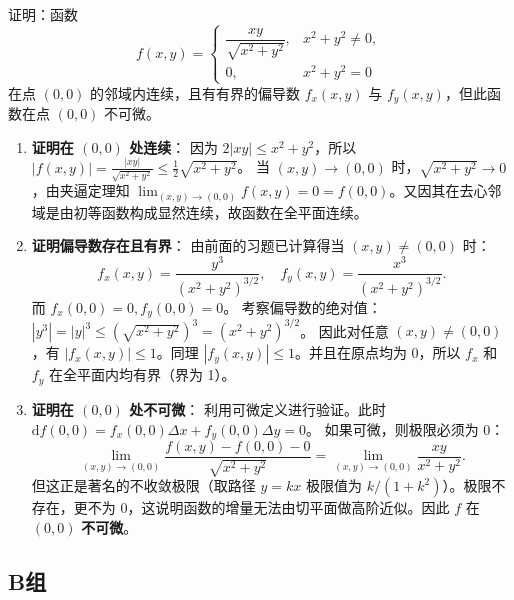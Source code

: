 \documentclass[lang=cn,11pt]{elegantbook}
\begin{document}
\begin{exercise}[可微性判定与偏导数有界性]
证明：函数
\[
f(x,y) = \begin{cases}
\dfrac{xy}{\sqrt{x^2+y^2}}, & x^2+y^2 \neq 0, \\
0, & x^2+y^2 = 0
\end{cases}
\]
在点 $(0,0)$ 的邻域内连续，且有有界的偏导数 $f_x(x,y)$ 与 $f_y(x,y)$，但此函数在点 $(0,0)$ 不可微。
\end{exercise}
\begin{solution}
\begin{enumerate}
  \item \textbf{证明在 $(0,0)$ 处连续}：
  因为 $2|xy| \le x^2+y^2$，所以 $|f(x,y)| = \frac{|xy|}{\sqrt{x^2+y^2}} \le \frac{1}{2}\sqrt{x^2+y^2}$。
  当 $(x,y)\to (0,0)$ 时，$\sqrt{x^2+y^2} \to 0$，由夹逼定理知 $\lim_{(x,y)\to (0,0)} f(x,y) = 0 = f(0,0)$。又因其在去心邻域是由初等函数构成显然连续，故函数在全平面连续。
  
  \item \textbf{证明偏导数存在且有界}：
  由前面的习题已计算得当 $(x,y) \neq (0,0)$ 时：
  \[
  f_x(x,y) = \frac{y^3}{(x^2+y^2)^{3/2}}, \quad f_y(x,y) = \frac{x^3}{(x^2+y^2)^{3/2}}.
  \]
  而 $f_x(0,0)=0, f_y(0,0)=0$。
  考察偏导数的绝对值：$|y^3| = |y|^3 \le (\sqrt{x^2+y^2})^3 = (x^2+y^2)^{3/2}$。
  因此对任意 $(x,y)\neq(0,0)$，有 $|f_x(x,y)| \le 1$。同理 $|f_y(x,y)| \le 1$。并且在原点均为 0，所以 $f_x$ 和 $f_y$ 在全平面内均有界（界为 1）。
  
  \item \textbf{证明在 $(0,0)$ 处不可微}：
  利用可微定义进行验证。此时 $\mathrm{d}f(0,0) = f_x(0,0)\Delta x + f_y(0,0)\Delta y = 0$。
  如果可微，则极限必须为 $0$：
  \[
  \lim_{(x,y)\to(0,0)} \frac{f(x,y) - f(0,0) - 0}{\sqrt{x^2+y^2}} = \lim_{(x,y)\to(0,0)} \frac{xy}{x^2+y^2}.
  \]
  但这正是著名的不收敛极限（取路径 $y=kx$ 极限值为 $k/(1+k^2)$）。极限不存在，更不为 $0$，这说明函数的增量无法由切平面做高阶近似。因此 $f$ 在 $(0,0)$ \textbf{不可微}。
\end{enumerate}
\end{solution}

\subsection{B组}
\end{document}
